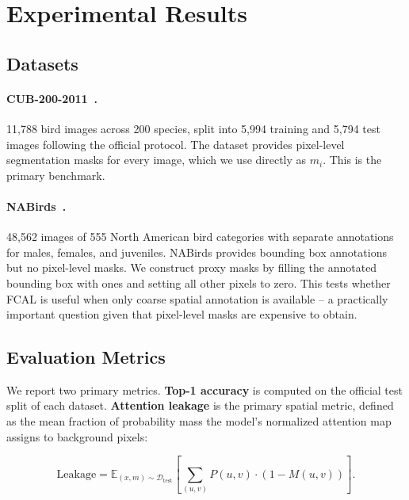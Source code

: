 \documentclass[journal]{IEEEtran}
\begin{document}
\section{Experimental Results}
\label{sec:experiments}

\subsection{Datasets}

\paragraph{CUB-200-2011~\cite{WahCUB_200_2011}.}
11,788 bird images across 200 species, split into 5,994 training
and 5,794 test images following the official protocol.
The dataset provides pixel-level segmentation masks for every
image, which we use directly as $m_i$. This is the primary
benchmark.

\paragraph{NABirds~\cite{vanhorn2015building}.}
48,562 images of 555 North American bird categories with separate
annotations for males, females, and juveniles. NABirds provides
bounding box annotations but no pixel-level masks. We construct
proxy masks by filling the annotated bounding box with ones and
setting all other pixels to zero. This tests whether FCAL is
useful when only coarse spatial annotation is available -- a
practically important question given that pixel-level masks
are expensive to obtain.

\subsection{Evaluation Metrics}

We report two primary metrics. \textbf{Top-1 accuracy} is computed
on the official test split of each dataset. \textbf{Attention
leakage} is the primary spatial metric, defined as the mean
fraction of probability mass the model's normalized attention map
assigns to background pixels:

\begin{equation}
  \mathrm{Leakage}
    = \mathbb{E}_{(x,m) \sim \mathcal{D}_{\mathrm{test}}}
      \!\left[\sum_{(u,v)} P(u,v) \cdot (1 - M(u,v))\right].
  \label{eq:leakage_metric}
\end{equation}
\end{document}
